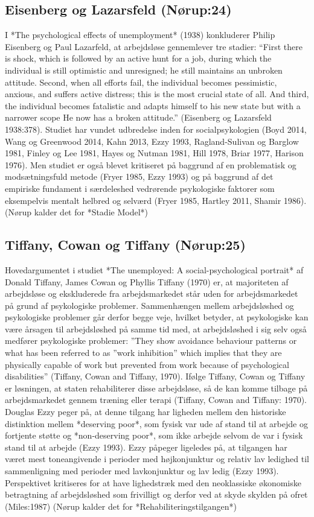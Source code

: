 \subsection{Eisenberg og Lazarsfeld (Nørup:24) \label{}}
I *The psychological effects of unemployment* (1938) konkluderer Philip Eisenberg og Paul Lazarfeld, at arbejdsløse gennemlever tre stadier: “First there is shock, which is followed by an active hunt for a job, during which the individual is still optimistic and unresigned; he still maintains an unbroken attitude. Second, when all efforts fail, the individual becomes pessimistic, anxious, and suffers active distress; this is the most crucial state of all. And third, the individual becomes fatalistic and adapts himself to his new state but with a narrower scope He now has a broken attitude.” (Eisenberg og Lazarsfeld 1938:378).
Studiet har vundet udbredelse inden for socialpsykologien (Boyd 2014, Wang og Greenwood 2014, Kahn 2013, Ezzy 1993, Ragland-Sulivan og Barglow 1981, Finley og Lee 1981, Hayes og Nutman 1981, Hill 1978, Briar 1977, Harison 1976). Men studiet er også blevet kritiseret på baggrund af en problematisk og modsætningsfuld metode (Fryer 1985, Ezzy 1993) og på baggrund af det empiriske fundament i særdeleshed vedrørende psykologiske faktorer som eksempelvis mentalt helbred og selværd (Fryer 1985, Hartley 2011, Shamir 1986). (Nørup kalder det for *Stadie Model*)

\subsection{Tiffany, Cowan og Tiffany (Nørup:25) \label{}}
Hovedargumentet i studiet *The unemployed: A social-psychological portrait*  af Donald Tiffany, James Cowan og Phyllis Tiffany (1970) er, at majoriteten af arbejdsløse og ekskluderede fra arbejdsmarkedet står uden for arbejdsmarkedet på grund af psykologiske problemer. Sammenhængen mellem arbejdsløshed og psykologiske problemer går derfor begge veje, hvilket betyder, at psykologiske kan være årsagen til arbejdsløshed på samme tid med, at arbejdsløshed i sig selv også medfører psykologiske problemer: ”They show avoidance behaviour patterns or what has been referred to as ”work inhibition” which implies that they are physically capable of work but prevented from work because of psychological disabilities” (Tiffany, Cowan and Tiffany, 1970). Ifølge Tiffany, Cowan og Tiffany er løsningen, at staten rehabiliterer disse arbejdsløse, så de kan komme tilbage på arbejdsmarkedet gennem træning eller terapi (Tiffany, Cowan and Tiffany: 1970). Douglas Ezzy peger på, at denne tilgang har ligheden mellem den historiske distinktion mellem *deserving poor*, som fysisk var ude af stand til at arbejde og fortjente støtte og *non-deserving poor*, som ikke arbejde selvom de var i fysisk stand til at arbejde (Ezzy 1993). Ezzy påpeger ligeledes på, at tilgangen har været mest toneangivende i perioder med højkonjunktur og relativ lav ledighed til sammenligning med perioder med lavkonjunktur og lav ledig (Ezzy 1993).
Perspektivet kritiseres for at have lighedstræk med den neoklassiske økonomiske betragtning af arbejdsløshed som frivilligt og derfor ved at skyde skylden på ofret (Miles:1987) (Nørup kalder det for *Rehabiliteringstilgangen*)


